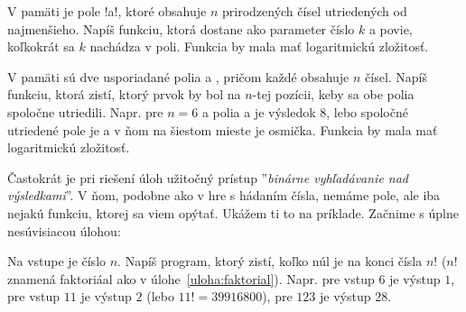 \begin{uloha}
  V pamäti je pole \prg!a!, ktoré obsahuje $n$ prirodzených čísel
  utriedených od najmenšieho. Napíš funkciu, ktorá dostane ako parameter 
  číslo $k$ a povie, koľkokrát sa $k$ nachádza v poli. Funkcia by mala
  mať logaritmickú zložitosť.
\end{uloha}

\begin{uloha}
  V pamäti sú dve usporiadané polia  a , pričom každé obsahuje $n$ čísel.
  Napíš funkciu, ktorá zistí, ktorý prvok by bol na $n$-tej pozícii, keby sa obe
  polia spoločne utriedili. Napr. pre $n=6$ a polia  a 
   je výsledok $8$, lebo spoločné utriedené pole
  je  a v ňom na šiestom mieste je osmička.
  Funkcia by mala mať logaritmickú zložitosť.
\end{uloha}

Častokrát je pri riešení úloh užitočný prístup 
''{\em binárne vyhľadávanie nad výsledkami}''. V ňom, podobne ako v hre s hádaním čísla, nemáme
pole, ale iba nejakú funkciu, ktorej sa viem opýtať. 
Ukážem ti to na príklade. 
Začnime s úplne nesúvisiacou úlohou:

\begin{uloha}
  \label{uloha:nulyfaktorialu}
  Na vstupe je číslo $n$. Napíš program, ktorý zistí, koľko núl je na konci čísla
  $n!$ ($n!$ znamená faktoriáal ako v úlohe~\ref{uloha:faktorial}). 
  Napr. pre vstup $6$ je výstup $1$, pre vstup $11$ je výstup $2$ (lebo
  $11!=39916800$), pre $123$ je výstup $28$.
\end{uloha}

